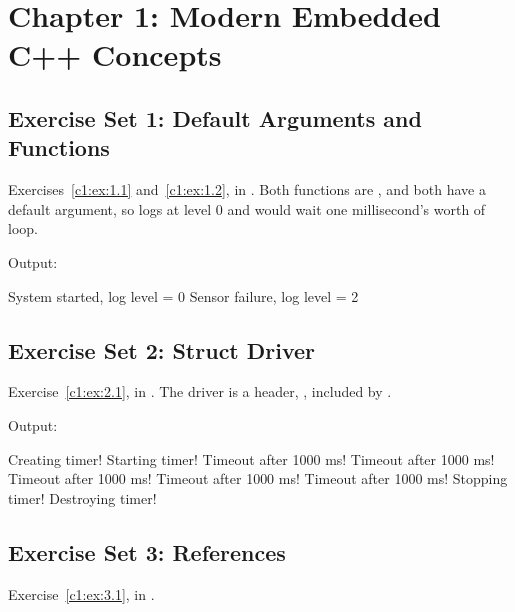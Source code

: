 
\section{Chapter 1: Modern Embedded C++ Concepts}
\label{sol:sec:c1}

\subsection{Exercise Set 1: Default Arguments and Functions}
\label{sol:set:c1.1}
Exercises~\ref{c1:ex:1.1} and~\ref{c1:ex:1.2}, in .
Both functions are , and both have a default argument, so
 logs at level 0 and  would wait one
millisecond's worth of loop.


\noindent Output:

\begin{console}
System started, log level = 0
Sensor failure, log level = 2
\end{console}

\subsection{Exercise Set 2: Struct Driver}
\label{sol:set:c1.2}
Exercise~\ref{c1:ex:2.1}, in . The driver is a
header, , included by .


\noindent Output:

\begin{console}
Creating timer!
Starting timer!
Timeout after 1000 ms!
Timeout after 1000 ms!
Timeout after 1000 ms!
Timeout after 1000 ms!
Timeout after 1000 ms!
Stopping timer!
Destroying timer!
\end{console}

\subsection{Exercise Set 3: References}
\label{sol:set:c1.3}
Exercise~\ref{c1:ex:3.1}, in .

